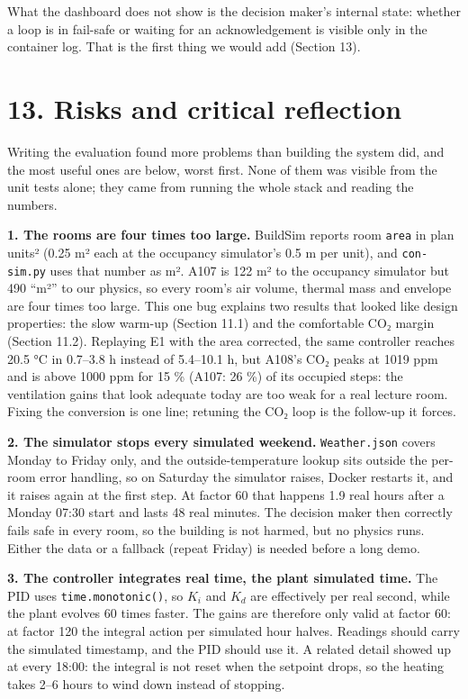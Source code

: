\documentclass[11pt]{article}
\makeatletter
\DeclareRobustCommand{\_}{\ifmmode\nfss@text{\textunderscore}\else\textunderscore\allowbreak\fi}
\newcommand{\file}[1]{\texttt{#1}}
\makeatother
\begin{document}
What the dashboard does not show is the decision maker's internal state: whether a
loop is in fail-safe or waiting for an acknowledgement is visible only in the
container log. That is the first thing we would add (Section 13).

\section{13. Risks and critical reflection}

Writing the evaluation found more problems than building the system did, and
the most useful ones are below, worst first. None of them was visible from the
unit tests alone; they came from running the whole stack and reading the
numbers.

\textbf{1. The rooms are four times too large.} BuildSim reports room
\texttt{area} in plan units² (0.25 m² each at the occupancy simulator's
0.5 m per unit), and \file{con-sim.py} uses that number as m². A107 is
122 m² to the occupancy simulator but 490 ``m²'' to our physics, so every room's
air volume, thermal mass and envelope are four times too large. This one bug
explains two results that looked like design properties: the slow warm-up
(Section 11.1) and the comfortable CO₂ margin (Section 11.2). Replaying E1 with
the area corrected, the same controller reaches 20.5 °C in 0.7–3.8 h instead
of 5.4–10.1 h, but A108's CO₂ peaks at 1019 ppm and is above
1000 ppm for 15 \% (A107: 26 \%) of its occupied steps: the ventilation gains that
look adequate today are too weak for a real lecture room. Fixing the conversion
is one line; retuning the CO₂ loop is the follow-up it forces.

\textbf{2. The simulator stops every simulated weekend.} \file{Weather.json}
covers Monday to Friday only, and the outside-temperature lookup sits outside the
per-room error handling, so on Saturday the simulator raises, Docker restarts it,
and it raises again at the first step. At factor 60 that happens 1.9 real hours
after a Monday 07:30 start and lasts 48 real minutes. The decision maker then
correctly fails safe in every room, so the building is not harmed, but no physics
runs. Either the data or a fallback (repeat Friday) is needed before a long demo.

\textbf{3. The controller integrates real time, the plant simulated time.} The PID
uses \texttt{time.monotonic()}, so $K_i$ and $K_d$ are effectively per real
second, while the plant evolves 60 times faster. The gains are therefore only
valid at factor 60: at factor 120 the integral action per simulated hour halves.
Readings should carry the simulated timestamp, and the PID should use it. A
related detail showed up at every 18:00: the integral is not reset when the
setpoint drops, so the heating takes 2–6 hours to wind down instead of stopping.
\end{document}
